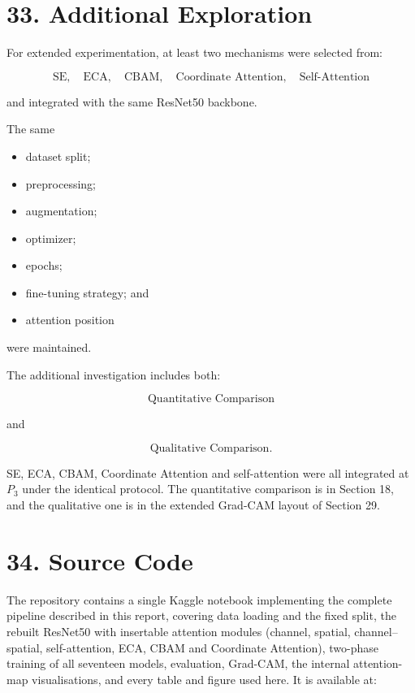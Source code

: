 \documentclass[10pt]{article}
\begin{document}
\section*{33. Additional Exploration}

For extended experimentation, at least two mechanisms were selected from:

\[
\boxed{
\text{SE},
\quad
\text{ECA},
\quad
\text{CBAM},
\quad
\text{Coordinate Attention},
\quad
\text{Self-Attention}
}
\]

and integrated with the same ResNet50 backbone.

The same

\begin{itemize}

\item dataset split;

\item preprocessing;

\item augmentation;

\item optimizer;

\item epochs;

\item fine-tuning strategy; and

\item attention position

\end{itemize}

were maintained.

The additional investigation includes both:

\[
\boxed{
\text{Quantitative Comparison}
}
\]

and

\[
\boxed{
\text{Qualitative Comparison}.
}
\]

SE, ECA, CBAM, Coordinate Attention and self-attention were all integrated at
$P_3$ under the identical protocol. The quantitative comparison is in Section 18,
and the qualitative one is in the extended Grad-CAM layout of Section 29.

\section*{34. Source Code}

The repository contains a single Kaggle notebook implementing the complete pipeline described in this report, covering data loading and the fixed split, the rebuilt ResNet50 with insertable attention modules (channel, spatial, channel--spatial, self-attention, ECA, CBAM and Coordinate Attention), two-phase training of all seventeen models, evaluation, Grad-CAM, the internal attention-map visualisations, and every table and figure used here. It is available at:\\
\end{document}
